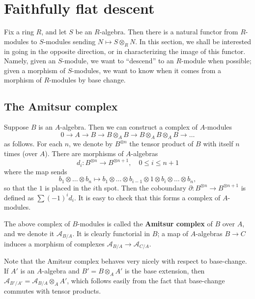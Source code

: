\section{Faithfully flat descent}

Fix a ring $R$, and let $S$ be an $R$-algebra. Then there is a natural functor
from $R$-modules to $S$-modules sending $N \mapsto S \otimes_R N$.
In this section, we shall be interested in going in the opposite direction,
or in characterizing the image of this functor.
Namely, given an $S$-module, we want to ``descend'' to an $R$-module when
possible; given a morphism of $S$-modules, we want to know when it comes from a
morphism of $R$-modules by base change.



\subsection{The Amitsur complex}

Suppose $B$ is an $A$-algebra. 
Then we can construct a complex of $A$-modules
\[ 0 \to A \to B \to B \otimes_A B \to B \otimes_A B \otimes_A B \to \dots  \]
as follows. 
For each $n$, we denote by $B^{\otimes n}$ the tensor product of $B$ with
itself $n$ times (over $A$).
There are morphisms of $A$-algebras
\[ d_i: B^{\otimes n} \to B^{\otimes n+1} , \quad 0 \leq i \leq n+1 \]
where the map sends
\[ b_1 \otimes \dots \otimes b_n \mapsto b_1 \otimes \dots \otimes b_{i-1}
\otimes  1 \otimes  b_i \otimes \dots \otimes b_n,  \]
so that the $1$ is placed in the $i$th spot.
Then the coboundary 
$\partial: B^{\otimes n} \to B^{\otimes n+1}$ is defined as $\sum (-1)^i d_i$.
It is easy to check that this forms a complex of $A$-modules.

\begin{definition} 
The above complex of $B$-modules is called the \textbf{Amitsur complex} of $B$
over $A$, and we denote it $\mathcal{A}_{B/A}$. It is clearly functorial in
$B$; a map of $A$-algebras $B \to C$ induces a morphism of complexes
$\mathcal{A}_{B/A} \to \mathcal{A}_{C/A}$.
\end{definition} 

Note that the Amitsur complex behaves very nicely with respect to base-change.
If $A'$ is an $A$-algebra and $B' = B \otimes_A A'$ is the base extension, then 
$\mathcal{A}_{B'/A'}  = \mathcal{A}_{B/A} \otimes_A A'$, which follows easily
from the fact that base-change commutes with tensor products.

